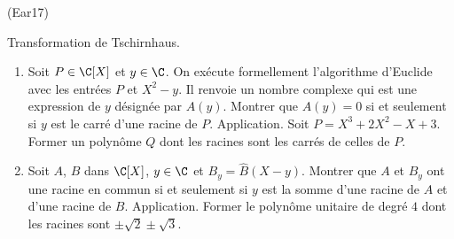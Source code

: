 \begin{tiny}(Ear17)\end{tiny} Transformation de Tschirnhaus.
\begin{enumerate}
  \item Soit $P\in \C[X]$ et $y \in \C$. On exécute formellement l'algorithme d'Euclide avec les entrées $P$ et $X^2-y$. Il renvoie un nombre complexe qui est une expression de $y$ désignée par $A(y)$.
Montrer que $A(y)=0$ si et seulement si $y$ est le carré d'une racine de $P$.\newline
Application. Soit $P = X^3+2X^2-X+3$.\newline
Former un polynôme $Q$ dont les racines sont les carrés de celles de $P$.
  \item Soit $A$, $B$ dans $\C[X]$, $y\in \C$ et $B_y = \widehat{B}(X-y)$.\newline
  Montrer que $A$ et $B_y$ ont une racine en commun si et seulement si $y$ est la somme d'une racine de $A$ et d'une racine de $B$.\newline
Application. Former le polynôme unitaire de degré $4$ dont les racines sont $\pm \sqrt{2} \pm \sqrt{3}$.
\end{enumerate}

